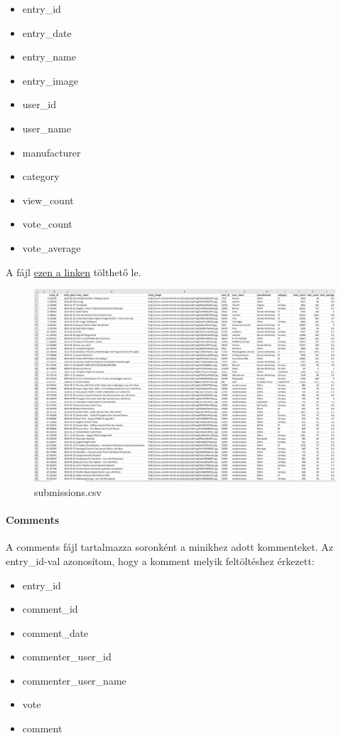 \documentclass[14pt,a4paper]{article}
\begin{document}
\begin{itemize}
\item entry\_id
\item entry\_date
\item entry\_name
\item entry\_image
\item user\_id
\item user\_name
\item manufacturer
\item category
\item view\_count
\item vote\_count
\item vote\_average
\end{itemize}

A fájl
\href{https://raw.githubusercontent.com/nemkin/cool-mini-or-not/main/data/cool\_mini\_or\_not\_submissions.csv}{ezen a linken}
tölthető le.

\begin{figure}[H]
\centering
\includegraphics[width=1.0\columnwidth]{pics/csv_submissions.png}
\caption{submissions.csv}
\end{figure}

\paragraph{Comments}

A comments fájl tartalmazza soronként a minikhez adott kommenteket. Az entry\_id-val azonosítom, hogy a komment
melyik feltöltéshez érkezett:

\begin{itemize}
\item entry\_id
\item comment\_id
\item comment\_date
\item commenter\_user\_id
\item commenter\_user\_name
\item vote
\item comment
\end{itemize}
\end{document}
